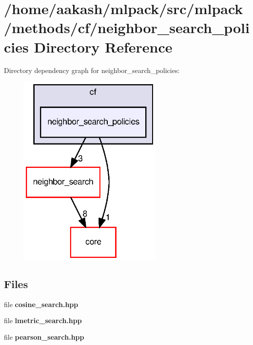\section{/home/aakash/mlpack/src/mlpack/methods/cf/neighbor\+\_\+search\+\_\+policies Directory Reference}
\label{dir_4c20f76d73845ecc1079e45764002a58}
Directory dependency graph for neighbor\+\_\+search\+\_\+policies\+:
\nopagebreak
\begin{figure}[H]
\begin{center}
\leavevmode
\includegraphics[width=203pt]{dir_4c20f76d73845ecc1079e45764002a58_dep}
\end{center}
\end{figure}
\subsection*{Files}
\begin{DoxyCompactItemize}
\item 
file \textbf{ cosine\+\_\+search.\+hpp}
\item 
file \textbf{ lmetric\+\_\+search.\+hpp}
\item 
file \textbf{ pearson\+\_\+search.\+hpp}
\end{DoxyCompactItemize}
